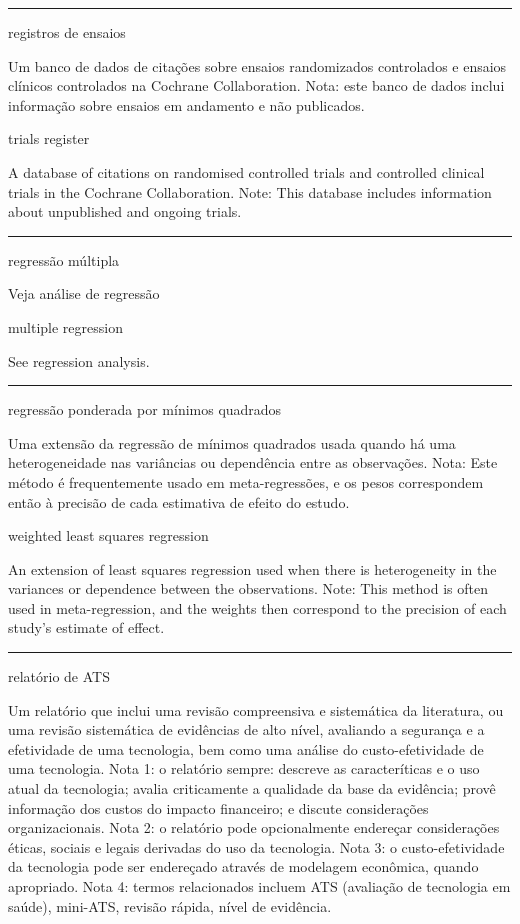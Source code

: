 \documentclass[
  openany]{book}
\begin{document}
\begin{center}\rule{0.5\linewidth}{0.5pt}\end{center}

registros de ensaios

Um banco de dados de citações sobre ensaios randomizados controlados e ensaios clínicos controlados na Cochrane Collaboration. Nota: este banco de dados inclui informação sobre ensaios em andamento e não publicados.

trials register

A database of citations on randomised controlled trials and controlled clinical trials in the Cochrane Collaboration. Note: This database includes information about unpublished and ongoing trials.

\begin{center}\rule{0.5\linewidth}{0.5pt}\end{center}

regressão múltipla

Veja análise de regressão

multiple regression

See regression analysis.

\begin{center}\rule{0.5\linewidth}{0.5pt}\end{center}

regressão ponderada por mínimos quadrados

Uma extensão da regressão de mínimos quadrados usada quando há uma heterogeneidade nas variâncias ou dependência entre as observações. Nota: Este método é frequentemente usado em meta-regressões, e os pesos correspondem então à precisão de cada estimativa de efeito do estudo.

weighted least squares regression

An extension of least squares regression used when there is heterogeneity in the variances or dependence between the observations. Note: This method is often used in meta-regression, and the weights then correspond to the precision of each study's estimate of effect.

\begin{center}\rule{0.5\linewidth}{0.5pt}\end{center}

relatório de ATS

Um relatório que inclui uma revisão compreensiva e sistemática da literatura, ou uma revisão sistemática de evidências de alto nível, avaliando a segurança e a efetividade de uma tecnologia, bem como uma análise do custo-efetividade de uma tecnologia. Nota 1: o relatório sempre: descreve as caracteríticas e o uso atual da tecnologia; avalia criticamente a qualidade da base da evidência; provê informação dos custos do impacto financeiro; e discute considerações organizacionais. Nota 2: o relatório pode opcionalmente endereçar considerações éticas, sociais e legais derivadas do uso da tecnologia. Nota 3: o custo-efetividade da tecnologia pode ser endereçado através de modelagem econômica, quando apropriado. Nota 4: termos relacionados incluem ATS (avaliação de tecnologia em saúde), mini-ATS, revisão rápida, nível de evidência.
\end{document}
